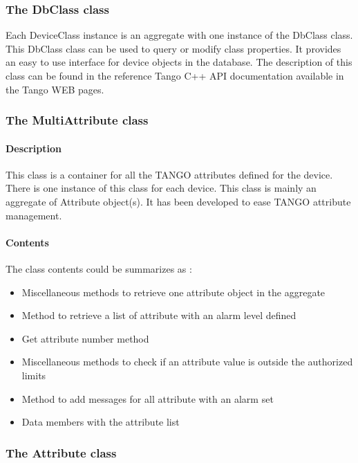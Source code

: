 \subsubsection{The DbClass class}

Each DeviceClass instance is an aggregate with one instance of the
DbClass class. This DbClass class can be used to query or modify class
properties. It provides an easy to use interface
for device objects in the database. The description of this class
can be found in the reference Tango C++ API documentation available
in the Tango WEB pages.

\subsubsection{The MultiAttribute class}

\paragraph{Description}

This class is a container for all the TANGO attributes defined for
the device. There is one instance of this class for each device. This
class is mainly an aggregate of Attribute object(s). It has been developed
to ease TANGO attribute management.

\paragraph{Contents}

The class contents could be summarizes as :
\begin{itemize}
\item Miscellaneous methods to retrieve one attribute
object in the aggregate
\item Method to retrieve a list of attribute with an alarm level defined
\item Get attribute number method
\item Miscellaneous methods to check if an attribute value is outside the
authorized limits
\item Method to add messages for all attribute with an alarm set
\item Data members with the attribute list
\end{itemize}

\subsubsection{The Attribute class}

